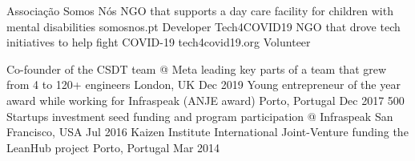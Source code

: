 \documentclass[]{awesome-cv}
\begin{document}
\vspace{-11mm}

\vspace{-3mm}

\begin{cvhonors}
	\cvhonor
	{Associação Somos Nós}
	{NGO that supports a day care facility for children with mental disabilities}
	{somosnos.pt}
	{Developer}
	\cvhonor
	{Tech4COVID19}
	{NGO that drove tech initiatives to help fight COVID-19}
	{tech4covid19.org}
	{Volunteer}
\end{cvhonors}

\vspace{-2mm}
\begin{cvhonors}
	\cvhonor
	{Co-founder of the CSDT team @ Meta}
	{leading key parts of a team that grew from 4 to 120+ engineers}
	{London, UK}
	{Dec 2019}
	\cvhonor
	{Young entrepreneur of the year award}
	{while working for Infraspeak (ANJE award)}
	{Porto, Portugal}
	{Dec 2017}
	\cvhonor
	{500 Startups investment}
	{seed funding and program participation @ Infraspeak}
	{San Francisco, USA}
	{Jul 2016}
	\cvhonor
	{Kaizen Institute International Joint-Venture}
	{funding the LeanHub project}
	{Porto, Portugal}
	{Mar 2014}
\end{cvhonors}
\
\end{document}

